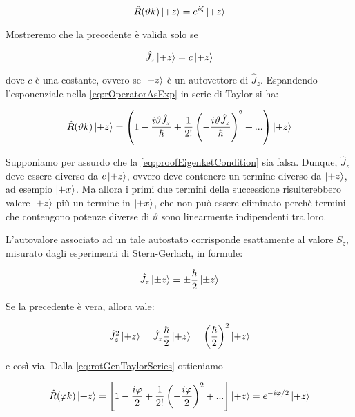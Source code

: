 	\begin{equation}
		\hat{R} (\vartheta k) \ket{+z} = e^{i \zeta} \ket{+z}
	\end{equation}

Mostreremo che la precedente \`e valida solo se

	\begin{equation} \label{eq:proofEigenketCondition}
		\hat{J}_z \ket{+z} = c \ket{+z}
	\end{equation}

dove $c$ \`e una costante, ovvero se $\ket{+z}$ \`e un autovettore di $\hat{J}_z$. Espandendo l'esponenziale nella \eqref{eq:rOperatorAsExp} in serie di Taylor si ha:

	\begin{equation} \label{eq:rotGenTaylorSeries}
		\hat{R} (\vartheta k) \ket{+z} = \left ( 1 - \frac{i \vartheta \hat{J}_z}{\hbar} + \frac{1}{2!} \left ( - \frac{i \vartheta \hat{J}_z}{\hbar} \right )^2 + ... \right ) \ket{+z}
	\end {equation}

Supponiamo per assurdo che la \eqref{eq:proofEigenketCondition} sia falsa. Dunque, $\hat{J}_z$ deve essere diverso da $c \ket{+z}$, ovvero deve contenere un termine diverso da $\ket{+z}$, ad esempio $\ket{+x}$. Ma allora i primi  due termini della successione risulterebbero valere $\ket{+z}$ pi\`u un termine in $\ket{+x}$, che non pu\`o essere eliminato perch\`e termini che contengono potenze diverse di $\vartheta$ sono linearmente indipendenti tra loro.

L'autovalore associato ad un tale autostato corrisponde esattamente al valore $S_z$, misurato dagli esperimenti di Stern-Gerlach, in formule:
 
 	\begin{equation}
 		\hat{J}_z \ket{\pm z} = \pm \frac{\hbar}{2} \ket{\pm z}
 	\end{equation}
 
Se la precedente \`e vera, allora vale:
 
 	\begin{equation}
 		\hat{J}_z^2 \ket{+z} = \hat{J}_z \frac{\hbar}{2} \ket{+z} = \left ( \frac{\hbar}{2} \right ) ^ 2 \ket{+z}
 	\end{equation}
 
e cos\`i via. Dalla \eqref{eq:rotGenTaylorSeries} ottieniamo
 
 	\begin{equation} \label{eq:rotateSpinUp}
 		\hat{R}( \varphi k) \ket{+z} = \left [ 1 - \frac{i \varphi}{2} + \frac{1}{2!} \left ( - \frac{i \varphi}{2} \right )^2 + ... \right ] \ket{+z} = e^{-i \varphi / 2} \ket{+z}
 	\end{equation}
 
